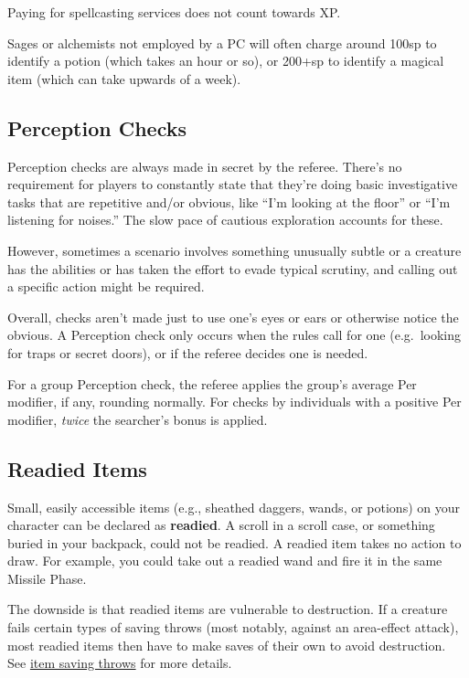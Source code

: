 \documentclass{article}
\begin{document}
\begin{multicols}{2}
Paying for spellcasting services does not count towards XP.

Sages or alchemists not employed by a PC will often charge around 100sp
to identify a potion (which takes an hour or so), or 200+sp to identify
a magical item (which can take upwards of a week).

\subsection{Perception Checks}\label{perception-checks}

Perception checks are always made in secret by the referee. There's no
requirement for players to constantly state that they're doing basic
investigative tasks that are repetitive and/or obvious, like ``I'm
looking at the floor'' or ``I'm listening for noises.'' The slow pace of
cautious exploration accounts for these.

However, sometimes a scenario involves something unusually subtle or a
creature has the abilities or has taken the effort to evade typical
scrutiny, and calling out a specific action might be required.

Overall, checks aren't made just to use one's eyes or ears or otherwise
notice the obvious. A Perception check only occurs when the rules call
for one (e.g.~looking for traps or secret doors), or if the referee
decides one is needed.

For a group Perception check, the referee applies the group's average
Per modifier, if any, rounding normally. For checks by individuals with
a positive Per modifier, \emph{twice} the searcher's bonus is applied.

\subsection{Readied Items}\label{readied-items}

Small, easily accessible items (e.g., sheathed daggers, wands, or
potions) on your character can be declared as \textbf{readied}. A scroll
in a scroll case, or something buried in your backpack, could not be
readied. A readied item takes no action to draw. For example, you could
take out a readied wand and fire it in the same Missile Phase.

The downside is that readied items are vulnerable to destruction. If a
creature fails certain types of saving throws (most notably, against an
area-effect attack), most readied items then have to make saves of their
own to avoid destruction. See \hyperref[item-saving-throws]{item saving
throws} for more details.


\end{multicols}
\end{document}
